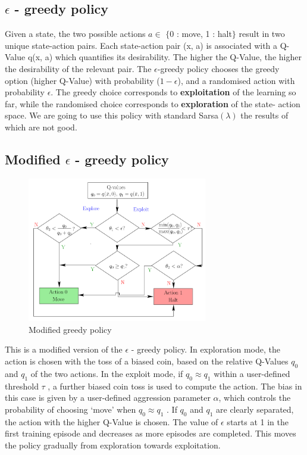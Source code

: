 \subsection{ $\epsilon$ - greedy policy}
Given a state, the two possible actions $a \in$  $\{$0 : move, 1 : halt$\}$ result in two unique
state-action pairs. Each state-action pair (x, a) is associated
with a Q-Value q(x, a) which quantifies its desirability. The higher the Q-Value, the higher the
desirability of the relevant pair. The $\epsilon$-greedy policy chooses
the greedy option (higher Q-Value) with probability ($1 - \epsilon$),
and a randomised action with probability $\epsilon$. The greedy choice
corresponds to \textbf{exploitation} of the learning so far, while the
randomised choice corresponds to \textbf{exploration} of the state-
action space. We are going to use this policy with standard Sarsa$(\lambda)$ the results of 
which are not good.

\subsection{Modified $\epsilon$ - greedy policy}

\begin{figure}[h]
    \centering
    \includegraphics[width=0.7\textwidth]{policy}
    \caption{ Modified greedy policy }
    \label{image-myimage20}
\end{figure}

This is a modified version of the $\epsilon$ - greedy policy.
In exploration mode, the action is chosen with the
toss of a biased coin, based on the relative Q-Values $q_0$ and $q_1$
of the two actions. In the exploit mode, if $q_0 \approx q_1$
within a user-defined threshold $\tau$ , a further biased coin toss
is used to compute the action. The bias in this case is given
by a user-defined aggression parameter $\alpha$, which controls the
probability of choosing ‘move’ when $q_0 \approx q_1$ . If $q_0$ and $q_1$
are clearly separated, the action with the higher Q-Value is
chosen. The value of $\epsilon$ starts at 1 in the first training episode
and decreases as more episodes are completed. This moves
the policy gradually from exploration towards exploitation.

